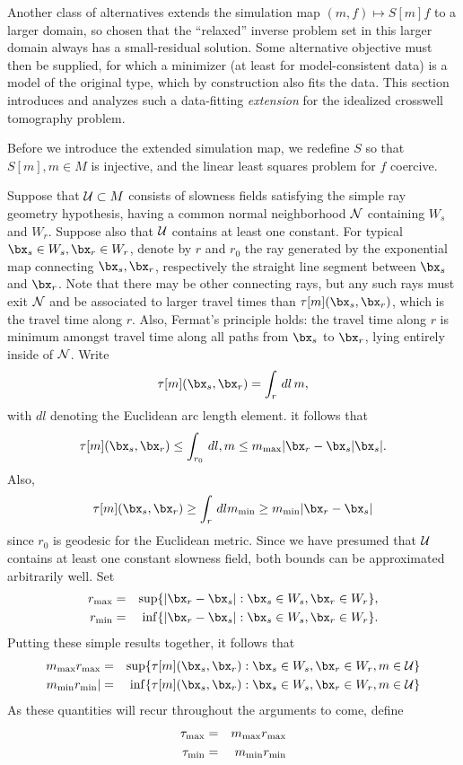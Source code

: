 Another class of alternatives extends the simulation map
$(m,f) \mapsto S[m]f$ to a larger domain, so chosen that the ``relaxed''
inverse problem set in this larger domain always has a small-residual
solution. Some alternative objective must then be supplied, for which
a minimizer (at least for model-consistent data) is a model of the
original type, which by construction also fits the data.
This section introduces and analyzes such a data-fitting {\em
  extension} for the idealized crosswell tomography problem.

Before we introduce the extended simulation map, we redefine $S$ so
that $S[m], m\in M$ is injective, and the linear least squares problem
for $f$ coercive.

Suppose that ${\cal U} \subset M$ consists of slowness fields
satisfying the simple ray geometry hypothesis, having a common normal
neighborhood ${\cal N}$ containing $W_s$ and $W_r$. Suppose also that
${\cal U}$ contains at least one constant.
For typical $\bx_s \in W_s, \bx_r \in W_r$, denote by $r$ and $r_0$
the ray generated by the exponential map connecting $\bx_s,\bx_r$, respectively
the straight line segment between $\bx_s$ and $\bx_r$. Note that there
may be other connecting rays, but any such rays must exit ${\cal N}$ and be associated to larger
travel times than $\tau[m](\bx_s,\bx_r)$, which is the travel time
along $r$. Also, Fermat's principle holds: the travel time along $r$
is minimum amongst travel time along all paths from $\bx_s$ to
$\bx_r$, lying entirely inside of ${\cal N}$. Write
\[
\tau[m](\bx_s,\bx_r) = \int_r \,dl\, m,
\]
with $dl$ denoting the Euclidean arc length element. it follows that
\[
\tau[m](\bx_s,\bx_r) \le \int_{r_0} \,dl, m \le m_{\rm max}|\bx_r -\bx_s|
\bx_s|.
\]
Also, 
\[
\tau[m](\bx_s,\bx_r) \ge \int_r \,dl m_{\rm min} \ge m_{\rm min}
|\bx_r-\bx_s|
\]
since $r_0$ is geodesic for the Euclidean metric. Since we have
presumed that ${\cal U}$ contains at least one constant slowness
field, both bounds can be approximated arbitrarily well.
Set
\begin{eqnarray}
\label{eqn:rdef}
r_{\rm max} &=& \sup \{|\bx_r-\bx_s|: \bx_s \in W_s, \bx_r \in
                W_r\},\nonumber\\
r_{\rm min} &=& \inf \{|\bx_r-\bx_s|: \bx_s \in W_s, \bx_r \in W_r\}.
\end{eqnarray}
Putting these simple results together, it follows that
\begin{eqnarray}
\label{eqn:tauglob}
m_{\rm max}r_{\rm max} & = & \sup \{\tau[m](\bx_s,\bx_r): \bx_s \in W_s, \bx_r \in 
  W_r, m \in {\cal U}\} \nonumber\\
m_{\rm min}r_{\rm min} |& = & \inf \{\tau[m](\bx_s,\bx_r): \bx_s \in W_s, \bx_r \in 
  W_r, m \in {\cal U}\}
\end{eqnarray}
As these quantities will recur throughout the arguments to come,
define
\begin{eqnarray}
\label{eqn:tauextr}
\tau_{\rm max}& = & m_{\rm max}r_{\rm max} \nonumber\\
\tau_{\rm min}& = & m_{\rm min}r_{\rm min}
\end{eqnarray}

